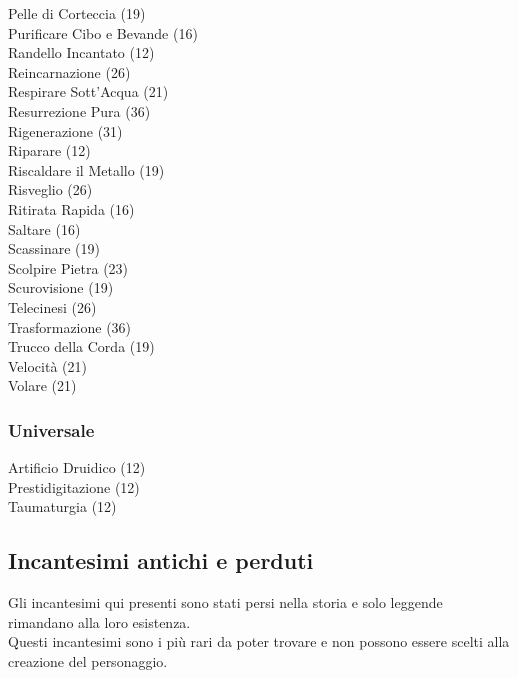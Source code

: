 \begin{multicols}{3}
	Pelle di Corteccia (19)\\
	Purificare Cibo e Bevande (16)\\
	Randello Incantato (12)\\
	Reincarnazione (26)\\
	Respirare Sott'Acqua (21)\\
	Resurrezione Pura (36)\\
	Rigenerazione (31)\\
	Riparare (12)\\
	Riscaldare il Metallo (19)\\
	Risveglio (26)\\
	Ritirata Rapida (16)\\
	Saltare (16)\\
	Scassinare (19)\\
	Scolpire Pietra (23)\\
	Scurovisione (19)\\
	Telecinesi (26)\\
	Trasformazione (36)\\
	Trucco della Corda (19)\\
	Velocità (21)\\
	Volare (21)\\
	
	\subsubsection{Universale}
	Artificio Druidico (12)\\
	Prestidigitazione (12)\\
	Taumaturgia (12)\\
	
	
	
\end{multicols}

\pagebreak

\subsection{Incantesimi antichi e perduti}

Gli incantesimi qui presenti sono stati persi nella storia e solo leggende rimandano alla loro esistenza.\\
Questi incantesimi sono i più rari da poter trovare e non possono essere scelti alla creazione del personaggio.

